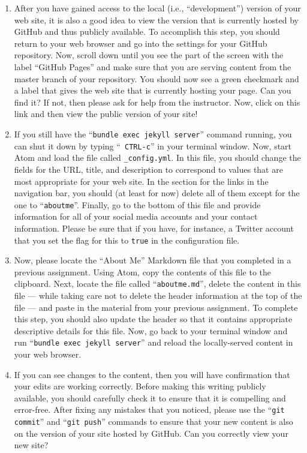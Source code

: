 \begin{enumerate}
  \item After you have gained access to the local (i.e., ``development'') version of your web site, it is also a good
    idea to view the version that is currently hosted by GitHub and thus publicly available. To accomplish this step,
    you should return to your web browser and go into the settings for your GitHub repository. Now, scroll down until
    you see the part of the screen with the label ``GitHub Pages'' and make sure that you are serving content from the
    master branch of your repository. You should now see a green checkmark and a label that gives the web site that is
    currently hosting your page. Can you find it? If not, then please ask for help from the instructor. Now,
    click on this link and then view the public version of your site!

  \item If you still have the ``{\tt bundle exec jekyll server}'' command running, you can shut it down by typing ``{\tt
    CTRL-c}'' in your terminal window. Now, start Atom and load the file called {\tt \_config.yml}. In this file, you
    should change the fields for the URL, title, and description to correspond to values that are most appropriate for
    your web site. In the section for the links in the navigation bar, you should (at least for now) delete all of them
    except for the one to ``{\tt aboutme}''. Finally, go to the bottom of this file and provide information for all of
    your social media accounts and your contact information. Please be sure that if you have, for instance, a Twitter
    account that you set the flag for this to {\tt true} in the configuration file.

  \item Now, please locate the ``About Me'' Markdown file that you completed in a previous assignment. Using Atom, copy
    the contents of this file to the clipboard. Next, locate the file called ``{\tt aboutme.md}'', delete the content in
    this file --- while taking care not to delete the header information at the top of the file --- and paste in the
    material from your previous assignment. To complete this step, you should also update the header so that it contains
    appropriate descriptive details for this file. Now, go back to your terminal window and run ``{\tt bundle exec
    jekyll server}'' and reload the locally-served content in your web browser.

  \item If you can see changes to the content, then you will have confirmation that your edits are working correctly.
    Before making this writing publicly available, you should carefully check it to ensure that it is compelling and
    error-free. After fixing any mistakes that you noticed, please use the ``{\tt git commit}'' and ``{\tt git push}''
    commands to ensure that your new content is also on the version of your site hosted by GitHub. Can you correctly
    view your new site?


\end{enumerate}
